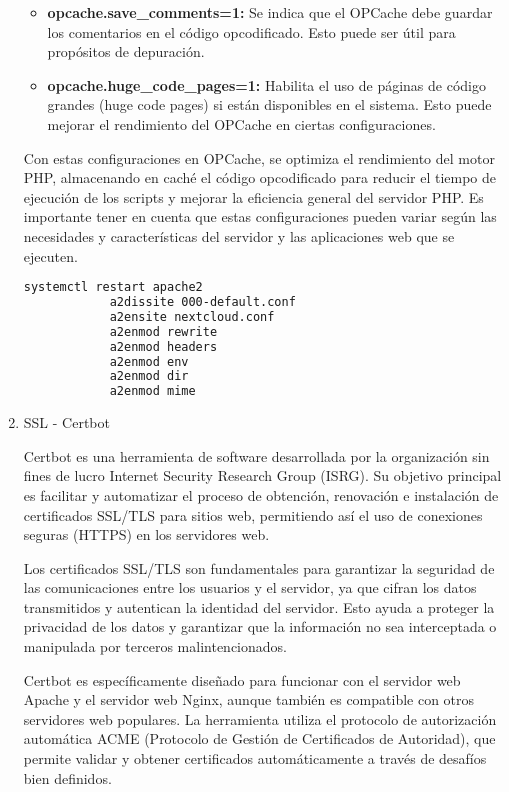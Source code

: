 \begin{enumerate}
\begin{itemize}
			\item\textbf{opcache.save\_comments=1:} Se indica que el OPCache debe guardar los comentarios en el código opcodificado. Esto puede ser útil para propósitos de depuración.
			
			\item\textbf{opcache.huge\_code\_pages=1:} Habilita el uso de páginas de código grandes (huge code pages) si están disponibles en el sistema. Esto puede mejorar el rendimiento del OPCache en ciertas configuraciones.
		

		\end{itemize}
			Con estas configuraciones en OPCache, se optimiza el rendimiento del motor PHP, almacenando en caché el código opcodificado para reducir el tiempo de ejecución de los scripts y mejorar la eficiencia general del servidor PHP. Es importante tener en cuenta que estas configuraciones pueden variar según las necesidades y características del servidor y las aplicaciones web que se ejecuten.	
			
			\begin{lstlisting}[language=Bash,caption=Habilitar]
			systemctl restart apache2
			a2dissite 000-default.conf
			a2ensite nextcloud.conf
			a2enmod rewrite
			a2enmod headers
			a2enmod env
			a2enmod dir
			a2enmod mime
			\end{lstlisting}
		
			\item SSL - Certbot \par 
			
			Certbot es una herramienta de software desarrollada por la organización sin fines de lucro Internet Security Research Group (ISRG). Su objetivo principal es facilitar y automatizar el proceso de obtención, renovación e instalación de certificados SSL/TLS para sitios web, permitiendo así el uso de conexiones seguras (HTTPS) en los servidores web.
			
			Los certificados SSL/TLS son fundamentales para garantizar la seguridad de las comunicaciones entre los usuarios y el servidor, ya que cifran los datos transmitidos y autentican la identidad del servidor. Esto ayuda a proteger la privacidad de los datos y garantizar que la información no sea interceptada o manipulada por terceros malintencionados.
			
			Certbot es específicamente diseñado para funcionar con el servidor web Apache y el servidor web Nginx, aunque también es compatible con otros servidores web populares. La herramienta utiliza el protocolo de autorización automática ACME (Protocolo de Gestión de Certificados de Autoridad), que permite validar y obtener certificados automáticamente a través de desafíos bien definidos.
			

\end{enumerate}

